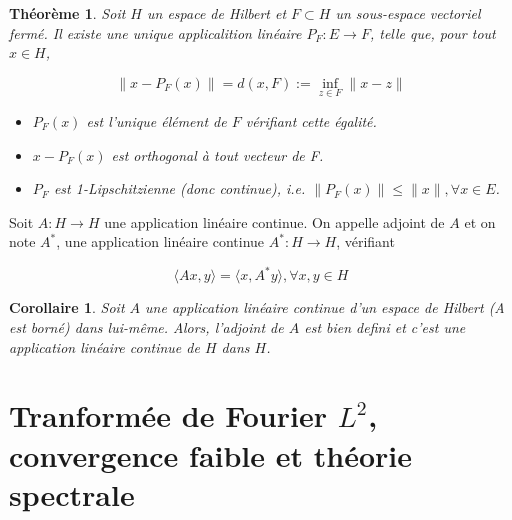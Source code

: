 \documentclass[10pt,a4paper,oneside]{article}
\newtheorem{theoreme}{Théorème}
\newtheorem{corollaire}{Corollaire}
\newenvironment{definition}[1][Definition]{\begin{trivlist}
\item[\hskip \labelsep {\bfseries #1}]}{\end{trivlist}}
\begin{document}
\begin{theoreme}
Soit $H$ un espace de Hilbert et $F \subset H$ un sous-espace vectoriel fermé. Il existe une unique applicalition linéaire $P_F: E \to F$, telle que, pour tout $x \in H$,

\[ \| x - P_F(x) \| = d(x,F) := \inf_{z \in F} \| x - z \| \]

\begin{itemize}
\item
$P_F(x)$ est l'unique élément de $F$ vérifiant cette égalité.

\item
$x - P_F(x)$ est orthogonal à tout vecteur de F.

\item
$P_F$ est 1-Lipschitzienne (donc continue), i.e. $\| P_F(x) \| \leq \| x \|, \forall x \in E$.

\end{itemize}

\end{theoreme}


\begin{definition}
Soit $A:H \rightarrow H$ une application linéaire continue. On appelle adjoint de $A$ et on note $A^*$, une application linéaire continue $A^*:H \rightarrow H$, vérifiant

\[ \langle Ax,y \rangle = \langle x,A^*y \rangle , \forall x,y \in H \]

\end{definition}


\begin{corollaire}
Soit $A$ une application linéaire continue d'un espace de Hilbert (A est borné) dans lui-même. Alors, l'adjoint de $A$ est bien defini et c'est une application linéaire continue de $H$ dans $H$.
\end{corollaire}


\section{Tranformée de Fourier $L^2$, convergence faible et théorie spectrale}
\end{document}
